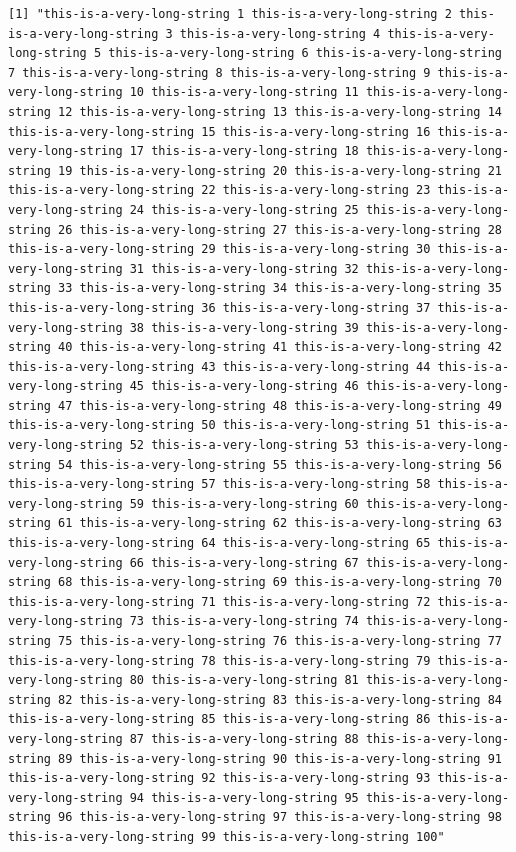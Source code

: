 \documentclass[
  letterpaper,
  DIV=11,
  numbers=noendperiod]{scrartcl}
\begin{document}
\begin{verbatim}
[1] "this-is-a-very-long-string 1 this-is-a-very-long-string 2 this-is-a-very-long-string 3 this-is-a-very-long-string 4 this-is-a-very-long-string 5 this-is-a-very-long-string 6 this-is-a-very-long-string 7 this-is-a-very-long-string 8 this-is-a-very-long-string 9 this-is-a-very-long-string 10 this-is-a-very-long-string 11 this-is-a-very-long-string 12 this-is-a-very-long-string 13 this-is-a-very-long-string 14 this-is-a-very-long-string 15 this-is-a-very-long-string 16 this-is-a-very-long-string 17 this-is-a-very-long-string 18 this-is-a-very-long-string 19 this-is-a-very-long-string 20 this-is-a-very-long-string 21 this-is-a-very-long-string 22 this-is-a-very-long-string 23 this-is-a-very-long-string 24 this-is-a-very-long-string 25 this-is-a-very-long-string 26 this-is-a-very-long-string 27 this-is-a-very-long-string 28 this-is-a-very-long-string 29 this-is-a-very-long-string 30 this-is-a-very-long-string 31 this-is-a-very-long-string 32 this-is-a-very-long-string 33 this-is-a-very-long-string 34 this-is-a-very-long-string 35 this-is-a-very-long-string 36 this-is-a-very-long-string 37 this-is-a-very-long-string 38 this-is-a-very-long-string 39 this-is-a-very-long-string 40 this-is-a-very-long-string 41 this-is-a-very-long-string 42 this-is-a-very-long-string 43 this-is-a-very-long-string 44 this-is-a-very-long-string 45 this-is-a-very-long-string 46 this-is-a-very-long-string 47 this-is-a-very-long-string 48 this-is-a-very-long-string 49 this-is-a-very-long-string 50 this-is-a-very-long-string 51 this-is-a-very-long-string 52 this-is-a-very-long-string 53 this-is-a-very-long-string 54 this-is-a-very-long-string 55 this-is-a-very-long-string 56 this-is-a-very-long-string 57 this-is-a-very-long-string 58 this-is-a-very-long-string 59 this-is-a-very-long-string 60 this-is-a-very-long-string 61 this-is-a-very-long-string 62 this-is-a-very-long-string 63 this-is-a-very-long-string 64 this-is-a-very-long-string 65 this-is-a-very-long-string 66 this-is-a-very-long-string 67 this-is-a-very-long-string 68 this-is-a-very-long-string 69 this-is-a-very-long-string 70 this-is-a-very-long-string 71 this-is-a-very-long-string 72 this-is-a-very-long-string 73 this-is-a-very-long-string 74 this-is-a-very-long-string 75 this-is-a-very-long-string 76 this-is-a-very-long-string 77 this-is-a-very-long-string 78 this-is-a-very-long-string 79 this-is-a-very-long-string 80 this-is-a-very-long-string 81 this-is-a-very-long-string 82 this-is-a-very-long-string 83 this-is-a-very-long-string 84 this-is-a-very-long-string 85 this-is-a-very-long-string 86 this-is-a-very-long-string 87 this-is-a-very-long-string 88 this-is-a-very-long-string 89 this-is-a-very-long-string 90 this-is-a-very-long-string 91 this-is-a-very-long-string 92 this-is-a-very-long-string 93 this-is-a-very-long-string 94 this-is-a-very-long-string 95 this-is-a-very-long-string 96 this-is-a-very-long-string 97 this-is-a-very-long-string 98 this-is-a-very-long-string 99 this-is-a-very-long-string 100"
\end{verbatim}
\end{document}
